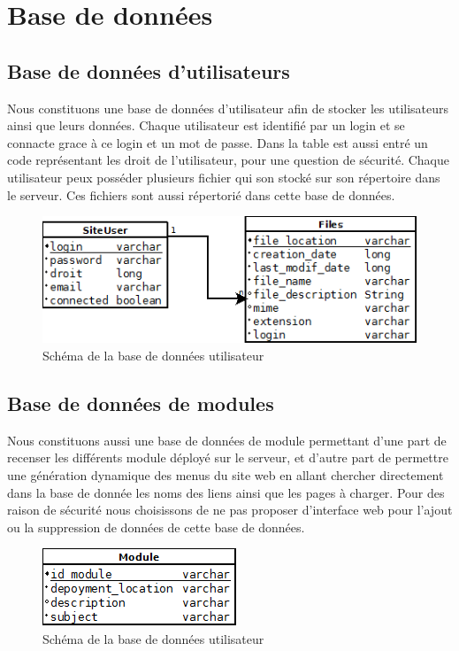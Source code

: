 \section{Base de données}

\subsection{Base de données d'utilisateurs}

Nous constituons une base de données d'utilisateur afin de stocker les utilisateurs ainsi que leurs données. Chaque utilisateur est identifié par un login et se connacte grace à ce login et un mot de passe. Dans la table est aussi entré un code représentant les droit de l'utilisateur, pour une question de sécurité. Chaque utilisateur peux posséder plusieurs fichier qui son stocké sur son répertoire dans le serveur. Ces fichiers sont aussi répertorié dans cette base de données.\\
\begin{figure}[position]
   \caption{Schéma de la base de données utilisateur}
   \includegraphics[scale=1]{BD1.png} 
\end{figure}


\subsection{Base de données de modules}

Nous constituons aussi une base de données de module permettant d'une part de recenser les différents module déployé sur le serveur, et d'autre part de permettre une génération dynamique des menus du site web en allant chercher directement dans la base de donnée les noms des liens ainsi que les pages à charger. Pour des raison de sécurité nous choisissons de ne pas proposer d'interface web pour l'ajout ou la suppression de données de cette base de données.\\
\begin{figure}[position]
   \caption{Schéma de la base de données utilisateur}
	\includegraphics[scale=1]{DBmodule.png} 
\end{figure}